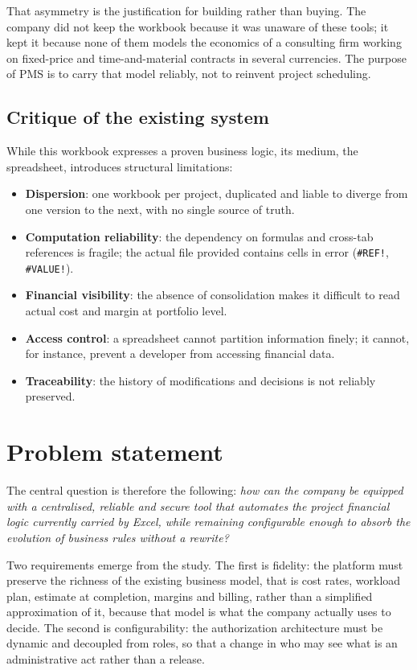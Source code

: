 That asymmetry is the justification for building rather than buying. The company did not keep the
workbook because it was unaware of these tools; it kept it because none of them models the economics
of a consulting firm working on fixed-price and time-and-material contracts in several currencies.
The purpose of PMS is to carry that model reliably, not to reinvent project scheduling.
\subsection{Critique of the existing system}
While this workbook expresses a proven business logic, its medium, the spreadsheet,
introduces structural limitations:

\begin{itemize}
    \item \textbf{Dispersion}: one workbook per project, duplicated and liable to diverge from one
    version to the next, with no single source of truth.
    \item \textbf{Computation reliability}: the dependency on formulas and cross-tab references is
    fragile; the actual file provided contains cells in error (\texttt{\#REF!},
    \texttt{\#VALUE!}).
    \item \textbf{Financial visibility}: the absence of consolidation makes it difficult to read
    actual cost and margin at portfolio level.
    \item \textbf{Access control}: a spreadsheet cannot partition information finely; it cannot, for
    instance, prevent a developer from accessing financial data.
    \item \textbf{Traceability}: the history of modifications and decisions is not reliably
    preserved.
\end{itemize}

\section{Problem statement}
The central question is therefore the following: \emph{how can the company be equipped with a
centralised, reliable and secure tool that automates the project financial logic currently carried
by Excel, while remaining configurable enough to absorb the evolution of business rules without a
rewrite?}

Two requirements emerge from the study. The first is fidelity: the platform must preserve the
richness of the existing business model, that is cost rates, workload plan, estimate at completion,
margins and billing, rather than a simplified approximation of it, because that model is what the
company actually uses to decide. The second is configurability: the authorization architecture must
be dynamic and decoupled from roles, so that a change in who may see what is an administrative act
rather than a release.

